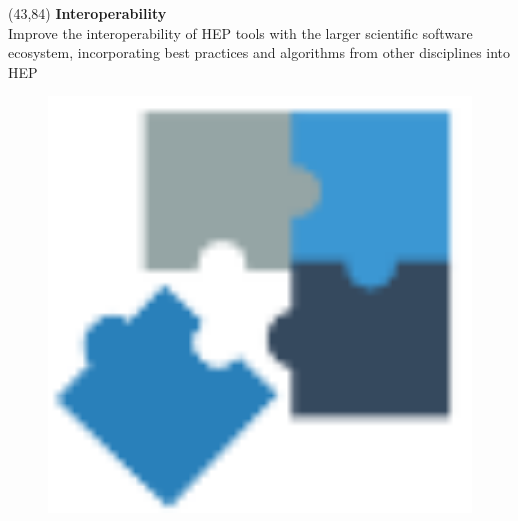 \begin{textblock}{17.5}(43,84)
{\bf Interoperability} \\
Improve the interoperability of HEP tools with the larger scientific software ecosystem, incorporating best practices and algorithms from other disciplines into HEP
\begin{figure}[tbph]
\centering
\includegraphics[width=1.0\textwidth]{interoperable.png}
\end{figure}
\end{textblock}

